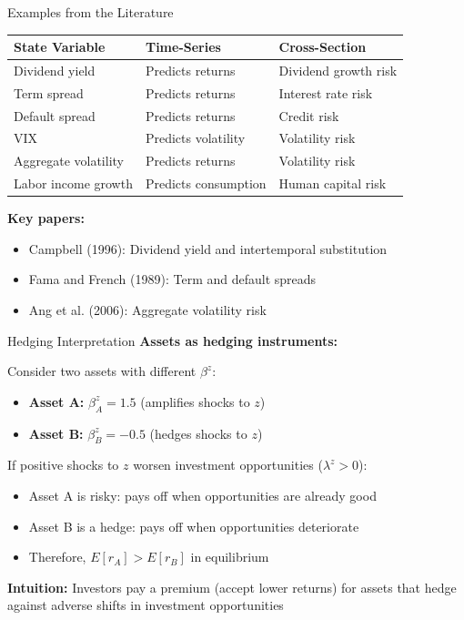 \documentclass{beamer}
\begin{document}
\begin{frame}{Examples from the Literature}
\begin{table}
\centering
\small
\begin{tabular}{lll}
\toprule
\textbf{State Variable} & \textbf{Time-Series} & \textbf{Cross-Section} \\
\midrule
Dividend yield & Predicts returns & Dividend growth risk \\
Term spread & Predicts returns & Interest rate risk \\
Default spread & Predicts returns & Credit risk \\
VIX & Predicts volatility & Volatility risk \\
Aggregate volatility & Predicts returns & Volatility risk \\
Labor income growth & Predicts consumption & Human capital risk \\
\bottomrule
\end{tabular}
\end{table}

\vspace{0.3cm}
\textbf{Key papers:}
\begin{itemize}
\item Campbell (1996): Dividend yield and intertemporal substitution
\item Fama and French (1989): Term and default spreads
\item Ang et al. (2006): Aggregate volatility risk
\end{itemize}
\end{frame}

\begin{frame}{Hedging Interpretation}
\textbf{Assets as hedging instruments:}

\vspace{0.3cm}
Consider two assets with different $\beta^z$:
\begin{itemize}
\item \textbf{Asset A:} $\beta_A^z = 1.5$ (amplifies shocks to $z$)
\item \textbf{Asset B:} $\beta_B^z = -0.5$ (hedges shocks to $z$)
\end{itemize}

\vspace{0.3cm}
If positive shocks to $z$ worsen investment opportunities ($\lambda^z > 0$):
\begin{itemize}
\item Asset A is risky: pays off when opportunities are already good
\item Asset B is a hedge: pays off when opportunities deteriorate
\item Therefore, $E[r_A] > E[r_B]$ in equilibrium
\end{itemize}

\vspace{0.3cm}
\textbf{Intuition:} Investors pay a premium (accept lower returns) for assets that hedge against adverse shifts in investment opportunities
\end{frame}
\end{document}
